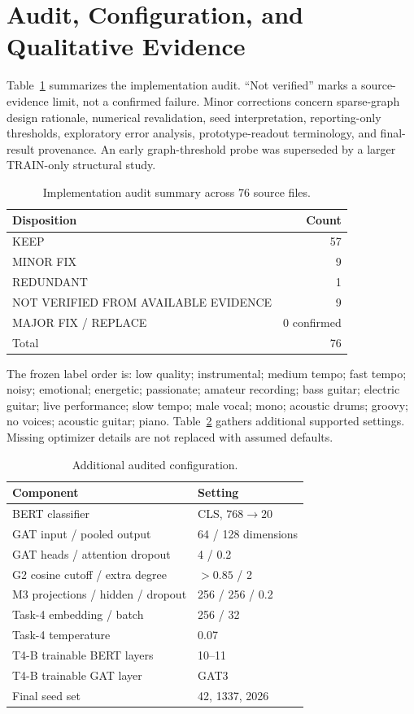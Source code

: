 \documentclass[conference]{IEEEtran}
\begin{document}
\section{Audit, Configuration, and Qualitative Evidence}\label{sec:appendix}
Table~\ref{tab:audit} summarizes the implementation audit. ``Not verified'' marks a source-evidence limit, not a confirmed failure. Minor corrections concern sparse-graph design rationale, numerical revalidation, seed interpretation, reporting-only thresholds, exploratory error analysis, prototype-readout terminology, and final-result provenance. An early graph-threshold probe was superseded by a larger TRAIN-only structural study.
\begin{table}[!ht]\centering\small
\caption{Implementation audit summary across 76 source files.}\label{tab:audit}
\begin{tabular}{@{}lr@{}}\toprule
Disposition & Count\\\midrule
KEEP & 57\\
MINOR FIX & 9\\
REDUNDANT & 1\\
NOT VERIFIED FROM AVAILABLE EVIDENCE & 9\\
MAJOR FIX / REPLACE & 0 confirmed\\\midrule
Total & 76\\\bottomrule
\end{tabular}
\end{table}

The frozen label order is: low quality; instrumental; medium tempo; fast tempo; noisy; emotional; energetic; passionate; amateur recording; bass guitar; electric guitar; live performance; slow tempo; male vocal; mono; acoustic drums; groovy; no voices; acoustic guitar; piano. Table~\ref{tab:config} gathers additional supported settings. Missing optimizer details are not replaced with assumed defaults.
\begin{table}[!ht]\centering\small
\caption{Additional audited configuration.}\label{tab:config}
\begin{tabular}{@{}ll@{}}\toprule
Component & Setting\\\midrule
BERT classifier & CLS, $768\to20$\\
GAT input / pooled output & 64 / 128 dimensions\\
GAT heads / attention dropout & 4 / 0.2\\
G2 cosine cutoff / extra degree & $>0.85$ / 2\\
M3 projections / hidden / dropout & 256 / 256 / 0.2\\
Task-4 embedding / batch & 256 / 32\\
Task-4 temperature & 0.07\\
T4-B trainable BERT layers & 10--11\\
T4-B trainable GAT layer & GAT3\\
Final seed set & 42, 1337, 2026\\\bottomrule
\end{tabular}
\end{table}
\end{document}
